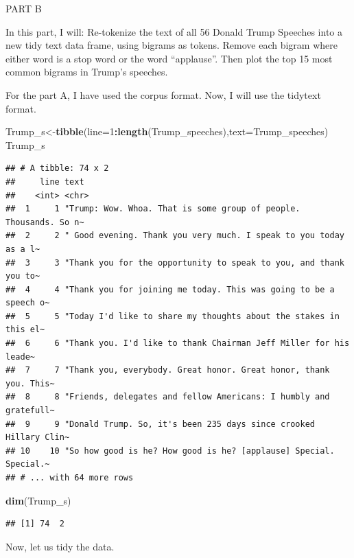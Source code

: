 \documentclass[]{article}
\newenvironment{Shaded}{\begin{snugshade}}{\end{snugshade}}
\newcommand{\KeywordTok}[1]{\textcolor[rgb]{0.13,0.29,0.53}{\textbf{#1}}}
\newcommand{\DataTypeTok}[1]{\textcolor[rgb]{0.13,0.29,0.53}{#1}}
\newcommand{\DecValTok}[1]{\textcolor[rgb]{0.00,0.00,0.81}{#1}}
\newcommand{\OperatorTok}[1]{\textcolor[rgb]{0.81,0.36,0.00}{\textbf{#1}}}
\newcommand{\NormalTok}[1]{#1}
\begin{document}
PART B

In this part, I will: Re-tokenize the text of all 56 Donald Trump
Speeches into a new tidy text data frame, using bigrams as tokens.
Remove each bigram where either word is a stop word or the word
``applause''. Then plot the top 15 most common bigrams in Trump's
speeches.

For the part A, I have used the corpus format. Now, I will use the
tidytext format.

\begin{Shaded}
\begin{Highlighting}[]
\NormalTok{Trump_s<-}\KeywordTok{tibble}\NormalTok{(}\DataTypeTok{line=}\DecValTok{1}\OperatorTok{:}\KeywordTok{length}\NormalTok{(Trump_speeches),}\DataTypeTok{text=}\NormalTok{Trump_speeches)}
\NormalTok{Trump_s}
\end{Highlighting}
\end{Shaded}

\begin{verbatim}
## # A tibble: 74 x 2
##     line text                                                             
##    <int> <chr>                                                            
##  1     1 "Trump: Wow. Whoa. That is some group of people. Thousands. So n~
##  2     2 " Good evening. Thank you very much. I speak to you today as a l~
##  3     3 "Thank you for the opportunity to speak to you, and thank you to~
##  4     4 "Thank you for joining me today. This was going to be a speech o~
##  5     5 "Today I'd like to share my thoughts about the stakes in this el~
##  6     6 "Thank you. I'd like to thank Chairman Jeff Miller for his leade~
##  7     7 "Thank you, everybody. Great honor. Great honor, thank you. This~
##  8     8 "Friends, delegates and fellow Americans: I humbly and gratefull~
##  9     9 "Donald Trump. So, it's been 235 days since crooked Hillary Clin~
## 10    10 "So how good is he? How good is he? [applause] Special. Special.~
## # ... with 64 more rows
\end{verbatim}

\begin{Shaded}
\begin{Highlighting}[]
\KeywordTok{dim}\NormalTok{(Trump_s)}
\end{Highlighting}
\end{Shaded}

\begin{verbatim}
## [1] 74  2
\end{verbatim}

Now, let us tidy the data.
\end{document}
